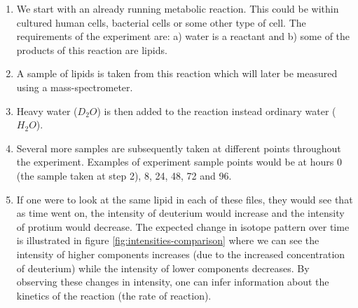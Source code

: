 \documentclass{l4proj}
\begin{document}
\begin{enumerate}
    \item We start with an already running metabolic reaction. This could be within cultured human cells, bacterial cells or some other type of cell. The requirements of the experiment are: a) water is a reactant and b) some of the products of this reaction are lipids.
    \item A sample of lipids is taken from this reaction which will later be measured using a mass-spectrometer.
    \item Heavy water ($D_2O$) is then added to the reaction instead ordinary water ($H_2O$).
    \item Several more samples are subsequently taken at different points throughout the experiment. Examples of experiment sample points would be at hours 0 (the sample taken at step 2), 8, 24, 48, 72 and 96.
    \item If one were to look at the same lipid in each of these files, they would see that as time went on, the intensity of deuterium would increase and the intensity of protium would decrease. The expected change in isotope pattern over time is illustrated in figure \ref{fig:intensities-comparison} where we can see the intensity of higher components increases (due to the increased concentration of deuterium) while the intensity of lower components decreases. By observing these changes in intensity, one can infer information about the kinetics of the reaction (the rate of reaction).
\end{enumerate}
\end{document}
